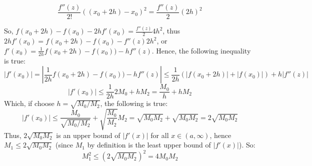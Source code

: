 \documentclass{article}
\begin{document}
\begin{itemize}
    $$\frac{f''(z)}{2!}((x_0+2h)-x_0)^2 = \frac{f''(z)}{2}(2h)^2$$

    So, $f(x_0+2h)-f(x_0)-2hf'(x_0)=\frac{f''(z)}{2}4h^2$, thus $2hf'(x_0)=f(x_0+2h)-f(x_0)-f''(z)2h^2$, or $f'(x_0)=\frac{1}{2h}f(x_0+2h)-f(x_0))-hf''(z)$. Hence, the following inequality is true:
    $$|f'(x_0)| = \left|\frac{1}{2h}f(x_0+2h)-f(x_0))-hf''(z)\right| \leq \frac{1}{2h}(|f(x_0+2h)|+|f(x_0)|) + h|f''(z)|$$
    $$|f'(x_0)| \leq \frac{1}{2h}2M_0 + hM_2 = \frac{M_0}{h}+hM_2$$
    Which, if choose $h=\sqrt{M_0/M_2}$, the following is true:
    $$|f'(x_0)| \leq \frac{M_0}{\sqrt{M_0/M_2}}+\sqrt{\frac{M_0}{M_2}}M_2 = \sqrt{M_0M_2}+\sqrt{M_0M_2}=2\sqrt{M_0M_2}$$
    Thus, $2\sqrt{M_0M_2}$ is an upper bound of $|f'(x)|$ for all $x\in(a,\infty)$, hence $M_1\leq 2\sqrt{M_0M_2}$ (since $M_1$ by definition is the least upper bound of $|f'(x)|$). So:
    $$M_1^2 \leq (2\sqrt{M_0M_2})^2 = 4M_0M_2$$


\end{itemize}
\end{document}

